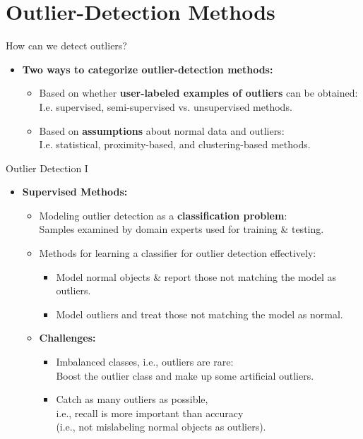 \section{Outlier-Detection Methods}

\begin{frame}{How can we detect outliers?}
  \begin{itemize}
  \item \textbf{Two ways to categorize outlier-detection methods:}
    \begin{itemize}
    \item Based on whether \textbf{\color{airforceblue}user-labeled examples of outliers} can be obtained: \\
      I.e. supervised, semi-supervised vs. unsupervised methods.
    \item Based on \textbf{\color{airforceblue}assumptions} about normal data and outliers: \\
      I.e. statistical, proximity-based, and clustering-based methods.
    \end{itemize}
  \end{itemize}
\end{frame}


\begin{frame}{Outlier Detection I}
  \begin{itemize}
  \item \textbf{Supervised Methods:}
    \begin{itemize}
    \item Modeling outlier detection as a \textbf{classification problem}:\\
      Samples examined by domain experts used for training \& testing.
    \item Methods for learning a classifier for outlier detection effectively:
      \begin{itemize}
      \item Model normal objects \& report those not matching the model as outliers.
      \item Model outliers and treat those not matching the model as normal.
      \end{itemize}
    \item \textbf{Challenges:}
      \begin{itemize}
      \item Imbalanced classes, i.e., outliers are rare: \\
        Boost the outlier class and make up some artificial outliers.
      \item Catch as many outliers as possible, \\
        i.e., recall is more important than accuracy \\
        (i.e., not mislabeling normal objects as outliers).
      \end{itemize}
    \end{itemize}
  \end{itemize}
\end{frame}


